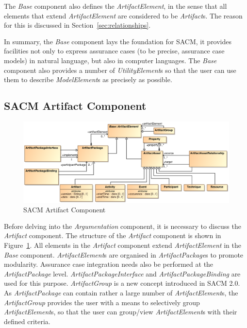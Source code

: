 The \textit{Base} component also defines the \textit{ArtifactElement}, in the sense that all elements that extend \textit{ArtifactElement} are considered to be \textit{Artifact}s. 
The reason for this is discussed in Section~\ref{sec:relationships}. 

In summary, the \textit{Base} component lays the foundation for SACM, it provides facilities not only to express assurance cases (to be precise, assurance case models) in natural language, but also in computer languages. 
The \textit{Base} component also provides a number of \textit{UtilityElement}s so that the user can use them to describe \textit{ModelElement}s as precisely as possible.

\subsection{SACM Artifact Component}
\label{sec:artiPack}

\begin{figure}
	\centering
	\includegraphics[width=1\linewidth]{Artifact.eps}
	\caption{SACM Artifact Component}
	\label{fig:arti}
\end{figure}

Before delving into the \textit{Argumentation} component, it is necessary to discuss the \textit{Artifact} component. The structure of the \textit{Artifact} component is shown in Figure~\ref{fig:arti}. 
All elements in the \textit{Artifact} component extend \textit{ArtifactElement} in the \textit{Base} component. \textit{ArtifactElement}s are organised in \textit{ArtifactPackage}s to promote modularity. 
Assurance case integration needs also be performed at the \textit{ArtifactPackage} level. 
\textit{ArtifactPackageInterface} and \textit{ArtifactPackageBinding} are used for this purpose.
\textit{ArtifactGroup} is a new concept introduced in SACM 2.0. 
As \textit{ArtifactPackage} can contain rather a large number of \textit{ArtifactElement}s, the \textit{ArtifactGroup} provides the user with a means to selectively group \textit{ArtifactElement}s, so that the user can group/view \textit{ArtifactElement}s with their defined criteria.

